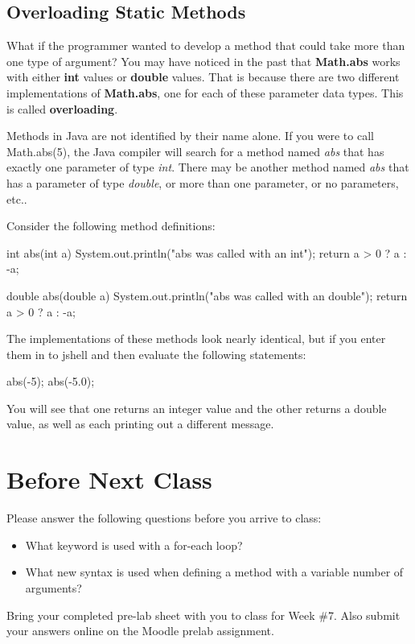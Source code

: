 \subsection{Overloading Static Methods}
What if the programmer wanted to develop a method that could take more than one type of argument? You may have noticed in the past that \textbf{Math.abs} works with either \textbf{int} values or \textbf{double} values. That is because there are two different implementations of \textbf{Math.abs}, one for each of these parameter data types. This is called \textbf{overloading}.

Methods in Java are not identified by their name alone. If you were to call Math.abs(5), the Java compiler will search for a method named \textit{abs} that has exactly one parameter of type \textit{int}. There may be another method named \textit{abs} that has a parameter of type \textit{double}, or more than one parameter, or no parameters, etc..

\begin{exa}

Consider the following method definitions:

\begin{code}
int abs(int a) {
  System.out.println("abs was called with an int");
  return a > 0 ? a : -a;
}

double abs(double a) {
  System.out.println("abs was called with an double");
  return a > 0 ? a : -a;
}
\end{code}

The implementations of these methods look nearly identical, but if you enter them in to jshell and then evaluate the following statements:

\begin{code}
abs(-5);
abs(-5.0);
\end{code}

You will see that one returns an integer value and the other returns a double value, as well as each printing out a different message. 
\end{exa}

\section{Before Next Class}

Please answer the following questions before you arrive to class:

\begin{exer}

\begin{itemize}

\item What keyword is used with a for-each loop?

  \evalline
  
\item What new syntax is used when defining a method with a variable number of arguments? 

  \evalline
  
\end{itemize}

\end{exer}

Bring your completed pre-lab sheet with you to class for Week \#7. Also submit your answers online on the Moodle prelab assignment.  

